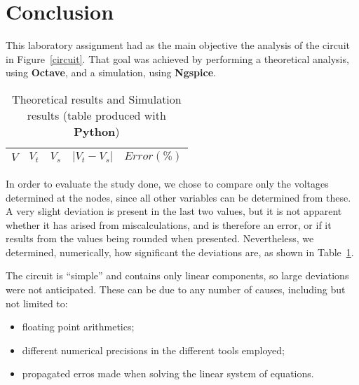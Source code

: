 \section{Conclusion}
\label{sec:conclusion}

This laboratory assignment had as the main objective the analysis of the circuit in Figure~\ref{circuit}. That goal was achieved by performing a theoretical analysis, using {\bf Octave}, and a simulation, using {\bf Ngspice}.

\begin{table}[H]
  \centering
  \begin{tabular}{|c|c|c|c|c|}
    \hline
        $V$ & $V_t$ & $V_s$ & $|V_t-V_s|$ & $Error (\%)$\footnotemark \\
        \hline
        \hline
        
        \hline
  \end{tabular}
  \caption{Theoretical results and Simulation results (table produced with {\bf Python})}
  \label{error_res}
\end{table}


In order to evaluate the study done, we chose to compare only the voltages determined at the nodes, since all other variables can be determined from these. A very slight deviation is present in the last two values, but it is not apparent whether it has arised from miscalculations, and is therefore an error, or if it results from the values being rounded when presented. Nevertheless, we determined, numerically, how significant the deviations are, as shown in Table~\ref{error_res}.



The circuit is ``simple'' and contains only linear components, so large deviations were not anticipated. These can be due to any number of causes, including but not limited to:

\begin{itemize}
\item floating point arithmetics;
\item different numerical precisions in the different tools employed;
\item propagated erros made when solving the linear system of equations.
\end{itemize}


